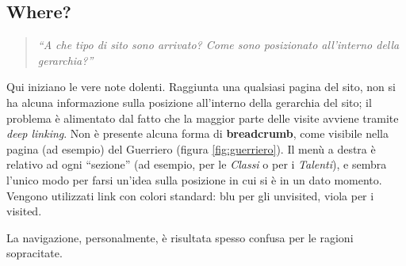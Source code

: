 \subsection{Where?}
\begin{quote}
    \emph{``A che tipo di sito sono arrivato? Come sono posizionato all'interno della gerarchia?''}
\end{quote}

Qui iniziano le vere note dolenti. Raggiunta una qualsiasi pagina del sito, non si ha alcuna informazione sulla posizione
all'interno della gerarchia del sito; il problema è alimentato dal fatto che la maggior parte delle visite avviene tramite
\emph{deep linking}. Non è presente alcuna forma di \textbf{breadcrumb}, come visibile nella pagina (ad esempio) del Guerriero 
(figura \ref{fig:guerriero}).
Il menù a destra è relativo ad ogni ``sezione'' (ad esempio, per le \emph{Classi} o per i \emph{Talenti}), e sembra l'unico modo 
per farsi un'idea sulla posizione in cui si è in un dato momento. Vengono utilizzati link con colori standard: blu per gli unvisited, viola 
per i visited. \par
La navigazione, personalmente, è risultata spesso confusa per le ragioni sopracitate.